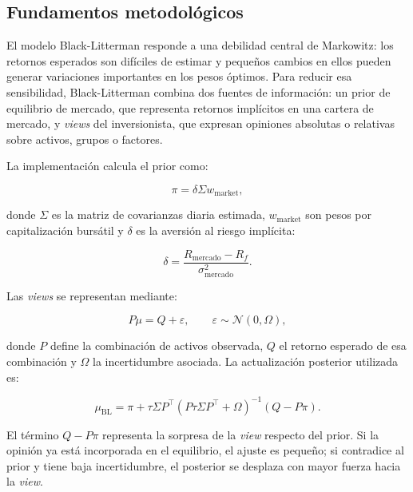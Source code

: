 \subsection*{Fundamentos metodol\'ogicos}

El modelo Black-Litterman responde a una debilidad central de Markowitz: los
retornos esperados son dif\'iciles de estimar y peque\~nos cambios en ellos pueden
generar variaciones importantes en los pesos \'optimos. Para reducir esa
sensibilidad, Black-Litterman combina dos fuentes de informaci\'on: un prior de
equilibrio de mercado, que representa retornos impl\'icitos en una cartera de
mercado, y \textit{views} del inversionista, que expresan opiniones absolutas o
relativas sobre activos, grupos o factores.

La implementaci\'on calcula el prior como:

\begin{equation}
\pi = \delta \Sigma w_{\text{market}},
\end{equation}

donde $\Sigma$ es la matriz de covarianzas diaria estimada, $w_{\text{market}}$
son pesos por capitalizaci\'on burs\'atil y $\delta$ es la aversi\'on al riesgo
impl\'icita:

\begin{equation}
\delta =
\frac{R_{\text{mercado}} - R_f}{\sigma^2_{\text{mercado}}}.
\end{equation}

Las \textit{views} se representan mediante:

\begin{equation}
P\mu = Q + \varepsilon, \qquad \varepsilon \sim \mathcal{N}(0,\Omega),
\end{equation}

donde $P$ define la combinaci\'on de activos observada, $Q$ el retorno esperado
de esa combinaci\'on y $\Omega$ la incertidumbre asociada. La actualizaci\'on
posterior utilizada es:

\begin{equation}
\mu_{\text{BL}} =
\pi + \tau\Sigma P^\top
(P\tau\Sigma P^\top + \Omega)^{-1}
(Q - P\pi).
\end{equation}

El t\'ermino $Q - P\pi$ representa la sorpresa de la \textit{view} respecto del
prior. Si la opini\'on ya est\'a incorporada en el equilibrio, el ajuste es
peque\~no; si contradice al prior y tiene baja incertidumbre, el posterior se
desplaza con mayor fuerza hacia la \textit{view}.

